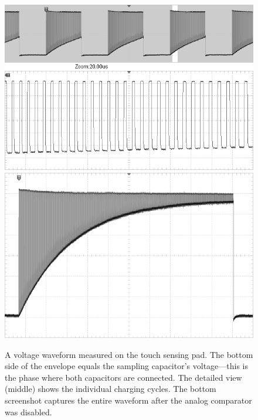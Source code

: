 \begin{figure}
	\centering
	\includegraphics[width=.9\textwidth] {img/tsc-wfm-bw.png} \\
	\vspace{5mm}
	\includegraphics[width=.9\textwidth] {img/tsc-wfm2-bw.png}
	\caption[TSC operation oscilloscope screenshots]{\label{fig:tsc-wfm}A voltage waveform measured on the touch sensing pad. The bottom side of the envelope equals the sampling capacitor's voltage---this is the phase where both capacitors are connected. The detailed view (middle) shows the individual charging cycles. The bottom screenshot captures the entire waveform after the analog comparator was disabled.}
\end{figure}


